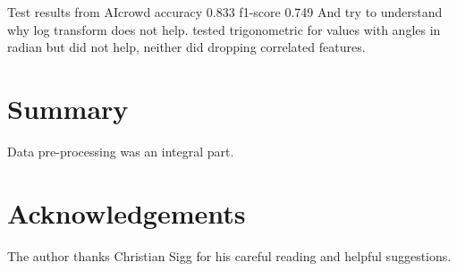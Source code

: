 \documentclass[10pt,conference,compsocconf]{IEEEtran}
\begin{document}
Test results from AIcrowd accuracy 0.833 f1-score 0.749	
And try to understand why log transform does not help. tested trigonometric 
for values with angles in radian but did not help, neither did dropping correlated features.

\section{Summary}

Data pre-processing was an integral part. 

\section*{Acknowledgements}
The author thanks Christian Sigg for his careful reading and helpful
suggestions.




\end{document}
